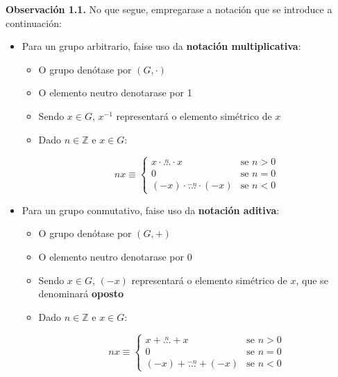 \documentclass[twoside]{report}
\theoremstyle{mystyle}
\begin{document}
\vspace{5mm}

\noindent \textbf{Observación 1.1.} No que segue, empregarase a notación que se introduce a continuación:

\begin{itemize}
    
    \item Para un grupo arbitrario, faise uso da \textbf{notación multiplicativa}:
    
    \begin{itemize}
        \item O grupo denótase por $(G, \cdot)$
        \item O elemento neutro denotarase por 1
        \item Sendo $x \in G$, $x^{-1}$ representará o elemento simétrico de $x$
        \item Dado $n \in \mathbb{Z}$ e $x \in G$:
        
\pagebreak
        
        \[
        nx \equiv 
        \begin{cases}
        x \cdot \stackrel{n}{\dots} \cdot x & \text{se } n > 0 \\
        0 & \text{se } n = 0 \\
        (-x) \cdot \stackrel{-n}{\dots} \cdot (-x) & \text{se } n < 0
        \end{cases}
        \]
    \end{itemize}
    
    
    \item Para un grupo conmutativo, faise uso da \textbf{notación aditiva}:
    
    \begin{itemize}
        \item O grupo denótase por $(G, +)$
        \item O elemento neutro denotarase por 0
        \item Sendo $x \in G$, $(-x)$ representará o elemento simétrico de $x$, que se denominará \textbf{oposto}
        
        \item Dado $n \in \mathbb{Z}$ e $x \in G$:
        
        \vspace{1mm}
        
        \[
        nx \equiv 
        \begin{cases}
        x + \stackrel{n}{\dots} + x & \text{se } n > 0 \\
        0 & \text{se } n = 0 \\
        (-x) + \stackrel{-n}{\dots} + (-x) & \text{se } n < 0
        \end{cases}
        \]

    \end{itemize}
\end{itemize}
\end{document}
